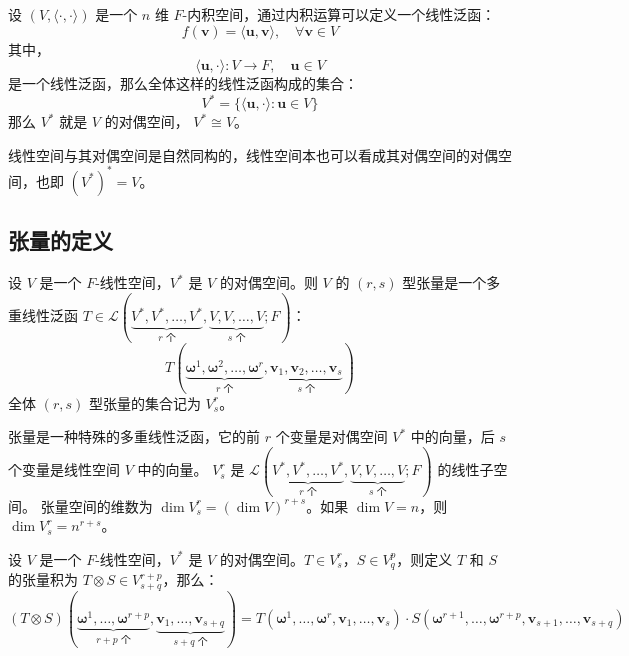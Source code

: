 \begin{example}
    设 $(V,\langle \cdot,\cdot\rangle)$ 是一个 $n$ 维 $F$-内积空间，通过内积运算可以定义一个线性泛函：
    \[
        f(\mathbf{v}) = \langle \mathbf{u},\mathbf{v} \rangle,\quad \forall \mathbf{v}\in V
    \]
    其中，
    \[
        \langle \mathbf{u},\cdot \rangle : V \to F,\quad \mathbf{u}\in V
    \]
    是一个线性泛函，那么全体这样的线性泛函构成的集合：
    \[
        V^* = \{\langle \mathbf{u},\cdot \rangle:\mathbf{u}\in V\}
    \]
    那么 $V^*$ 就是 $V$ 的对偶空间， $V^* \cong V$。
\end{example}

\begin{note}
    线性空间与其对偶空间是自然同构的，线性空间本也可以看成其对偶空间的对偶空间，也即 $(V^*)^* = V$。
\end{note}

\vspace{1em}

\subsection{张量的定义}

\begin{definition}[张量 Tensor]
    设 $V$ 是一个 $F$-线性空间，$V^*$ 是 $V$ 的对偶空间。则 $V$ 的 $(r,s)$ 型张量是一个多重线性泛函 $T \in \mathcal{L}(\underbrace{V^*,V^*,\ldots,V^*}_{r\text{ 个}},\underbrace{V,V,\ldots,V}_{s\text{ 个}};F)$：
    \[
        T(\underbrace{\bm{\omega}^1,\bm{\omega}^2,\ldots,\bm{\omega}^r}_{r\text{ 个}},\underbrace{\mathbf{v}_1,\mathbf{v}_2,\ldots,\mathbf{v}_s}_{s\text{ 个}})
    \]
    全体 $(r,s)$ 型张量的集合记为 $V^r_s$。
\end{definition}

\begin{note}
    张量是一种特殊的多重线性泛函，它的前 $r$ 个变量是对偶空间 $V^*$ 中的向量，后 $s$ 个变量是线性空间 $V$ 中的向量。
    $V^r_s$ 是 $\mathcal{L}(\underbrace{V^*,V^*,\ldots,V^*}_{r\text{ 个}},\underbrace{V,V,\ldots,V}_{s\text{ 个}};F)$ 的线性子空间。
    张量空间的维数为 $\dim V^r_s = (\dim V)^{r+s}$。如果 $\dim V = n$，则 $\dim V^r_s = n^{r+s}$。
\end{note}

\vspace{1em}

\begin{definition}
    设 $V$ 是一个 $F$-线性空间，$V^*$ 是 $V$ 的对偶空间。$T \in V^r_s$，$S \in V^p_q$，则定义 $T$ 和 $S$ 的张量积为 $T \otimes S \in V^{r+p}_{s+q}$，那么：
    \[
        (T \otimes S)(\underbrace{\bm{\omega}^1,\ldots,\bm{\omega}^{r+p}}_{r+p\text{ 个}},\underbrace{\mathbf{v}_1,\ldots,\mathbf{v}_{s+q}}_{s+q\text{ 个}}) = T(\bm{\omega}^1,\ldots,\bm{\omega}^r,\mathbf{v}_1,\ldots,\mathbf{v}_s) \cdot S(\bm{\omega}^{r+1},\ldots,\bm{\omega}^{r+p},\mathbf{v}_{s+1},\ldots,\mathbf{v}_{s+q})
    \]
    \label{def:tensor_product}
\end{definition}

